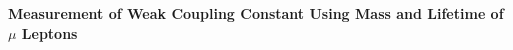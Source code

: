 \documentclass[psfig,12pt]{article}
\begin{document}
\pagestyle{fancy}

\begin{small}
\chead{} 
\rhead{\bfseries \today} 
\renewcommand{\headrulewidth}{0.1pt} 
\renewcommand{\footrulewidth}{0.1pt} 
\end{small}

\begin{center}
\begin{LARGE}
\bfseries Measurement of Weak Coupling Constant Using Mass and Lifetime of $\mu$ Leptons
\end{LARGE}
\end{center}














\end{document}
